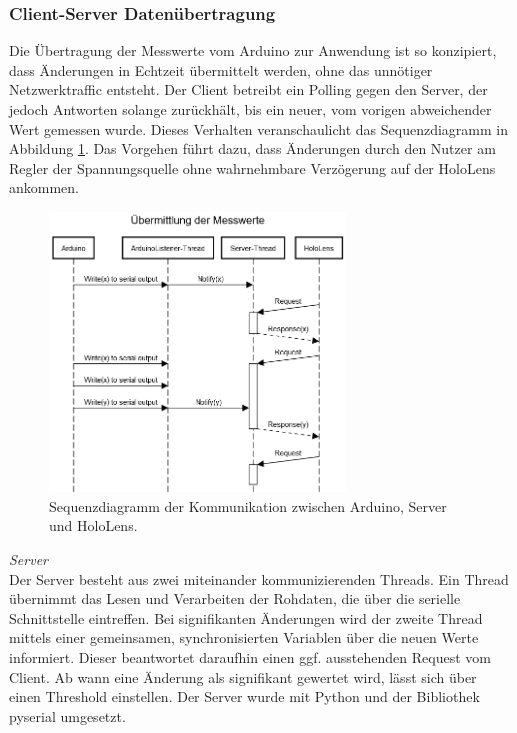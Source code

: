 \subsubsection{Client-Server Datenübertragung}
\label{sec-5-1-1}
Die Übertragung der Messwerte vom Arduino zur Anwendung ist so konzipiert, dass Änderungen in Echtzeit übermittelt werden, ohne das unnötiger Netzwerktraffic entsteht. Der Client betreibt ein Polling gegen den Server, der jedoch Antworten solange zurückhält, bis ein neuer, vom vorigen abweichender Wert gemessen wurde. Dieses Verhalten veranschaulicht das Sequenzdiagramm in Abbildung \ref{img:Sequenzdiagramm}. Das Vorgehen führt dazu, dass Änderungen durch den Nutzer am Regler der Spannungsquelle ohne wahrnehmbare Verzögerung auf der HoloLens ankommen.

\begin{figure}[H]
	\centering
	\includegraphics[width=0.7\textwidth]{images/schema/Sequenzdiagramm.png}
	\caption{Sequenzdiagramm der Kommunikation zwischen Arduino, Server und HoloLens.}
	\label{img:Sequenzdiagramm}
\end{figure}

\textit{Server}\\
Der Server besteht aus zwei miteinander kommunizierenden Threads. Ein Thread übernimmt das Lesen und Verarbeiten der Rohdaten, die über die serielle Schnittstelle eintreffen. Bei signifikanten Änderungen wird der zweite Thread mittels einer gemeinsamen, synchronisierten Variablen über die neuen Werte informiert. Dieser beantwortet daraufhin einen ggf. ausstehenden Request vom Client. Ab wann eine Änderung als signifikant gewertet wird, lässt sich über einen Threshold einstellen. Der Server wurde mit Python und der Bibliothek pyserial umgesetzt.\\

